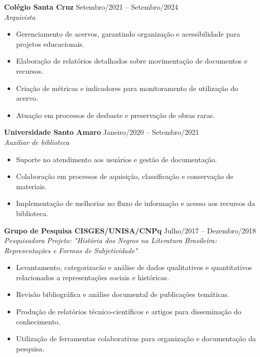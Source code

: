\documentclass[a4paper,10pt]{article}
\newcommand{\entry}[4]{
  \noindent\textbf{#1} \hfill #2 \\
  \noindent\textit{#3} \hfill \textit{#4} \\
  \vspace{2pt}
}
\begin{document}
\vspace{0.6em}

\entry{Colégio Santa Cruz }{\faCalendar \space Setembro/2021 -- Setembro/2024}{Arquivista}
\space
\vspace{-1.6em}
\begin{itemize}
\setlength\itemsep{0em}
\item Gerenciamento de acervos, garantindo organização e acessibilidade para projetos educacionais.
\item Elaboração de relatórios detalhados sobre movimentação de documentos e recursos.
\item Criação de métricas e indicadores para monitoramento de utilização do acervo.
\item Atuação em processos de desbaste e preservação de obras raras.

\end{itemize}

\entry{Universidade Santo Amaro}{\faCalendar \space 
 Janeiro/2020 -- Setembro/2021}{Auxiliar de biblioteca}
\space
\vspace{-1.6em}
\begin{itemize}
\setlength\itemsep{0em}
\item Suporte no atendimento aos usuários e gestão de documentação.
\item Colaboração em processos de aquisição, classificação e conservação de materiais.
\item Implementação de melhorias no fluxo de informação e acesso aos recursos da biblioteca.

\end{itemize}

\entry{Grupo de Pesquisa CISGES/UNISA/CNPq}{\faCalendar \space 
 Julho/2017 -- Dezembro/2018}{Pesquisadora}{Projeto: "História dos Negros na Literatura Brasileira: Representações e Formas de Subjetividade"}
\space
\vspace{-1.6em}
\begin{itemize}
\setlength\itemsep{0em}
\item Levantamento, categorizacão e análise de dados qualitativos e quantitativos relacionados a representações sociais e históricas.
\item Revisão bibliográfica e análise documental de publicações temáticas.
\item Produção de relatórios técnico-científicos e artigos para disseminação do conhecimento.
\item Utilização de ferramentas colaborativas para organização e documentação da pesquisa.

\end{itemize}
\end{document}

